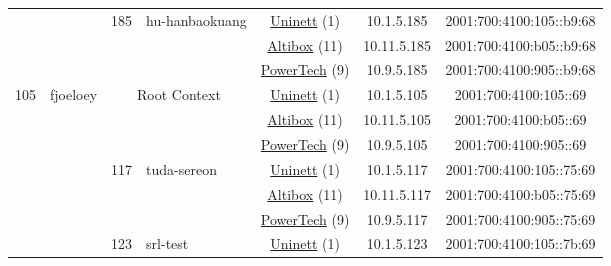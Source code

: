 \begin{small}
\begin{center}
\begin{longtable}{|c|c|c|c|c|c|c|c|}
  &  & \multirow{3}{*}{\tiny{185}} & \multicolumn{1}{|l|}{\multirow{3}{*}{\tiny{hu-hanbaokuang}}} & \multicolumn{2}{|c|}{\tiny{\href{https://www.uninett.no}{Uninett} (1)}} & \tiny{10.1.5.185} & \tiny{2001:700:4100:105::b9:68} \\* \cline{5-5}\cline{6-6}\cline{7-7}\cline{8-8}
  &  &  &  & \multicolumn{2}{|c|}{\tiny{\href{https://www.altibox.no}{Altibox} (11)}} & \tiny{10.11.5.185} & \tiny{2001:700:4100:b05::b9:68} \\* \cline{5-5}\cline{6-6}\cline{7-7}\cline{8-8}
  &  &  &  & \multicolumn{2}{|c|}{\tiny{\href{http://www.powertech.no}{PowerTech} (9)}} & \tiny{10.9.5.185} & \tiny{2001:700:4100:905::b9:68} \\ \hline
 \multirow{39}{*}{\tiny{105}} & \multicolumn{1}{|l|}{\multirow{39}{*}{\tiny{fjoeloey}}} & \multicolumn{2}{|c|}{\multirow{3}{*}{\tiny{Root Context}}} & \multicolumn{2}{|c|}{\tiny{\href{https://www.uninett.no}{Uninett} (1)}} & \tiny{10.1.5.105} & \tiny{2001:700:4100:105::69} \\* \cline{5-5}\cline{6-6}\cline{7-7}\cline{8-8}
  &  & \multicolumn{2}{|c|}{} & \multicolumn{2}{|c|}{\tiny{\href{https://www.altibox.no}{Altibox} (11)}} & \tiny{10.11.5.105} & \tiny{2001:700:4100:b05::69} \\* \cline{5-5}\cline{6-6}\cline{7-7}\cline{8-8}
  &  & \multicolumn{2}{|c|}{} & \multicolumn{2}{|c|}{\tiny{\href{http://www.powertech.no}{PowerTech} (9)}} & \tiny{10.9.5.105} & \tiny{2001:700:4100:905::69} \\* \cline{3-3}\cline{4-4}\cline{5-5}\cline{6-6}\cline{7-7}\cline{8-8}
  &  & \multirow{3}{*}{\tiny{117}} & \multicolumn{1}{|l|}{\multirow{3}{*}{\tiny{tuda-sereon}}} & \multicolumn{2}{|c|}{\tiny{\href{https://www.uninett.no}{Uninett} (1)}} & \tiny{10.1.5.117} & \tiny{2001:700:4100:105::75:69} \\* \cline{5-5}\cline{6-6}\cline{7-7}\cline{8-8}
  &  &  &  & \multicolumn{2}{|c|}{\tiny{\href{https://www.altibox.no}{Altibox} (11)}} & \tiny{10.11.5.117} & \tiny{2001:700:4100:b05::75:69} \\* \cline{5-5}\cline{6-6}\cline{7-7}\cline{8-8}
  &  &  &  & \multicolumn{2}{|c|}{\tiny{\href{http://www.powertech.no}{PowerTech} (9)}} & \tiny{10.9.5.117} & \tiny{2001:700:4100:905::75:69} \\* \cline{3-3}\cline{4-4}\cline{5-5}\cline{6-6}\cline{7-7}\cline{8-8}
  &  & \multirow{3}{*}{\tiny{123}} & \multicolumn{1}{|l|}{\multirow{3}{*}{\tiny{srl-test}}} & \multicolumn{2}{|c|}{\tiny{\href{https://www.uninett.no}{Uninett} (1)}} & \tiny{10.1.5.123} & \tiny{2001:700:4100:105::7b:69} \\* \cline{5-5}\cline{6-6}\cline{7-7}\cline{8-8}

\end{longtable}
\end{center}
\end{small}
